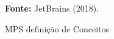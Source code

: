 \begin{figure}[h!]
\centering

\caption{\textmd{MPS definição de Conceitos}}
\label{fig:mpsconceitos}

\par\medskip\textbf{Fonte:} JetBrains (2018). \par\medskip
\end{figure}
